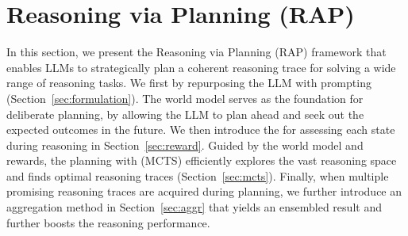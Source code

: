\section{Reasoning via Planning (RAP)}












In this section, we present the Reasoning via Planning (RAP) framework that enables LLMs to strategically plan a coherent reasoning trace for solving a wide range of reasoning tasks. We first  by repurposing the LLM with prompting (Section~\ref{sec:formulation}). The world model serves as the foundation for deliberate planning, by allowing the LLM to plan ahead and seek out the expected outcomes in the future. We then introduce the  for assessing each state during reasoning in Section~\ref{sec:reward}. Guided by the world model and rewards, the planning with  (MCTS) efficiently explores the vast reasoning space and finds optimal reasoning traces (Section~\ref{sec:mcts}). Finally, when multiple promising reasoning traces are acquired during planning, we further introduce an aggregation method in Section~\ref{sec:aggr} that yields an ensembled result and further boosts the reasoning performance.

